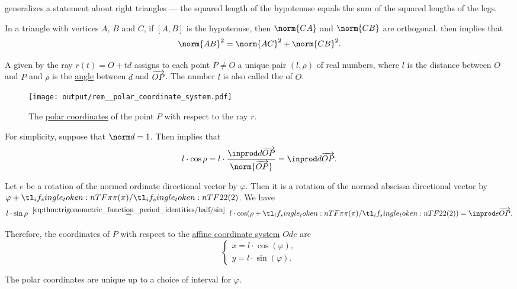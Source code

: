 \begin{remark}\label{rem:pythagoras_theorem_right_triangle}
   generalizes a statement about right triangles --- the squared length of the hypotenuse equals the sum of the squared lengths of the legs.

  In a triangle with vertices \( A \), \( B \) and \( C \), if \( [A, B] \) is the hypotenuse, then \( \norm{CA} \) and \( \norm{CB} \) are orthogonal.  then implies that
  \begin{equation*}
    \norm{AB}^2 = \norm{AC}^2 + \norm{CB}^2.
  \end{equation*}
\end{remark}

\begin{remark}\label{rem:polar_coordinate_system}
  A  given by the ray \( r(t) = O + td \) assigns to each point \( P \neq O \) a unique pair \( (l, \rho) \) of real numbers, where \( l \) is the distance between \( O \) and \( P \) and \( \rho \) is the \hyperref[def:angle]{angle} between \( d \) and \( \overrightarrow{OP} \). The number \( l \) is also called the  of \( O \).

  \begin{figure}[!ht]
    \centering
    \texttt{[image: output/rem\_\_polar\_coordinate\_system.pdf]}
    \caption{The \hyperref[rem:polar_coordinate_system]{polar coordinates} of the point \( P \) with respect to the ray \( r \).}\label{fig:rem:polar_coordinate_system}
  \end{figure}

  For simplicity, suppose that \( \norm d = 1 \). Then  implies that
  \begin{equation*}
    l \cdot \cos \rho = l \cdot \frac {\inprod d {\vect{OP}}} {\norm{\vect{OP}}} = \inprod d {\vect{OP}}.
  \end{equation*}

  Let \( e \) be a rotation of the normed ordinate directional vector by \( \varphi \). Then it is a rotation of the normed abscissa directional vector by \( \varphi + \ifrac \pi 2 \). We have
  \begin{equation*}
    l \cdot \sin \rho
    \reloset {\eqref{eq:thm:trigonometric_function_period_identities/half/sin}} =
    l \cdot \cos(\rho + \ifrac \pi 2)
    =
    \inprod e {\vect{OP}}.
  \end{equation*}

  Therefore, the coordinates of \( P \) with respect to the \hyperref[def:affine_coordinate_system]{affine coordinate system} \( Ode \) are
  \begin{equation}\label{eq:rem:polar_coordinate_system/simple}
    \begin{cases}
      x = l \cdot \cos(\varphi), \\
      y = l \cdot \sin(\varphi).
    \end{cases}
  \end{equation}

  The polar coordinates are unique up to a choice of interval for \( \varphi \).
\end{remark}


